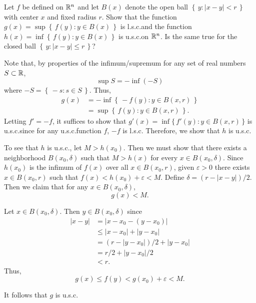 \begin{problem}
  Let $f$ be defined on $\mathbb{R}^n$ and let $B(x)$ denote the open ball
  $\left\{\,y:|x-y|<r\,\right\}$ with center $x$ and fixed radius $r$. Show
  that the function $g(x)=\sup\left\{\,f(y):y\in B(x)\,\right\}$ is
  l.s.c.\@ and the function $h(x)=\inf\left\{\,f(y):y\in B(x)\,\right\}$ is
  u.s.c.\@ on $\mathbb{R}^n$. Is the same true for the closed ball
  $\left\{\,y:|x-y|\leq r\,\right\}$?
\end{problem}
\begin{solution}
  Note that, by properties of the infimum/supremum for any set of real
  numbers $S\subset\mathbb{R}$,
  \[
    \sup S=-\inf (-S)
  \]
  where $-S=\left\{\,-s:s\in S\,\right\}$. Thus,
  \begin{align*}
    g(x)
    &=-\inf\left\{\,-f(y):y\in B(x,r)\,\right\}\\
    &=\sup\left\{\,f(y):y\in B(x,r)\, \right\}.
  \end{align*}
  Letting $f'=-f$, it suffices to show that $g'(x)=\inf\{\,f'(y):y\in
  B(x,r)\,\}$ is u.s.c.\@ since for any u.s.c.\@ function $f$, $-f$ is
  l.s.c. Therefore, we show that $h$ is u.s.c.

  To see that $h$ is u.s.c., let $M>h(x_0)$. Then we must show that there
  exists a neighborhood $B(x_0,\delta)$ such that $M>h(x)$ for every
  $x\in B(x_0,\delta)$. Since $h(x_0)$ is the infimum of $f(x)$ over all
  $x\in B(x_0,r)$, given $\varepsilon>0$ there exists $x\in B(x_0,r)$ such
  that $f(x)<h(x_0)+\varepsilon<M$. Define $\delta=(r-|x-y|)/2$. Then we
  claim that for any $x\in B(x_0,\delta)$,
  \[
    g(x)<M.
  \]
  \begin{subproof}
    Let $x\in B(x_0,\delta)$. Then $y\in B(x_0,\delta)$ since
    \begin{align*}
      |x-y|&=|x-x_0-(y-x_0)|\\
           &\leq |x-x_0|+|y-x_0|\\
           &=(r-|y-x_0|)/2+|y-x_0|\\
           &=r/2+|y-x_0|/2\\
           &<r.
    \end{align*}
    Thus,
    \[
      g(x)\leq f(y)<g(x_0)+\varepsilon<M.
    \]
  \end{subproof}
  It follows that $g$ is u.s.c.
\end{solution}

